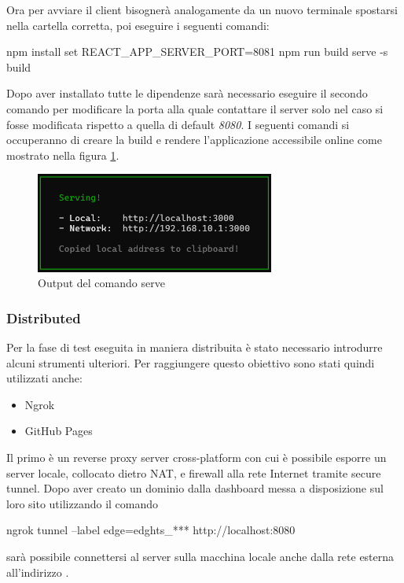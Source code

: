Ora per avviare il client bisognerà analogamente da un nuovo terminale spostarsi nella cartella corretta, poi eseguire i seguenti comandi:

\begin{lcverbatim}
    npm install
    set REACT_APP_SERVER_PORT=8081
    npm run build
    serve -s build
\end{lcverbatim}

Dopo aver installato tutte le dipendenze sarà necessario eseguire il secondo comando per modificare la porta alla quale contattare il server solo nel caso si fosse modificata rispetto a quella di default \emph{8080}. I seguenti comandi si occuperanno di creare la build e rendere l'applicazione accessibile online come mostrato nella figura \ref{fig:serve}.

\begin{figure}[H]
\centering
\includegraphics[width=0.7\textwidth]{img/screen/serve.png}
\caption{Output del comando serve}
\label{fig:serve}
\end{figure}

\subsubsection{Distributed}
Per la fase di test eseguita in maniera distribuita è stato necessario introdurre alcuni strumenti ulteriori. Per raggiungere questo obiettivo sono stati quindi utilizzati anche:
\begin{itemize}
    \item Ngrok\cite{ngrok}
    \item GitHub Pages\cite{gitHubreactghpages}
\end{itemize}

Il primo è un reverse proxy server cross-platform con cui è possibile esporre un server locale, collocato dietro NAT, e firewall alla rete Internet tramite secure tunnel. Dopo aver creato un dominio dalla dashboard messa a disposizione sul loro sito utilizzando il comando  
\begin{lcverbatim}
    ngrok tunnel --label edge=edghts_*** http://localhost:8080
\end{lcverbatim}
sarà possibile connettersi al server sulla macchina locale anche dalla rete esterna all'indirizzo .

